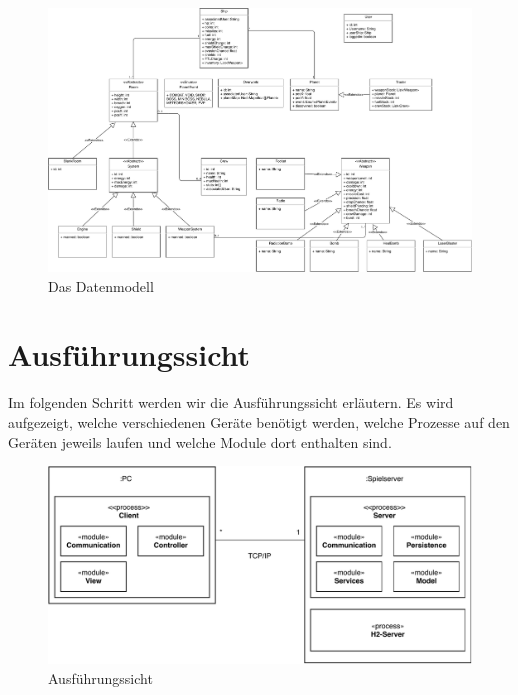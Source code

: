 \documentclass[fontsize=12pt,paper=a4,twoside]{scrartcl}
\begin{document}
\begin{figure}[H]
\begin{center}
  \includegraphics[width=\linewidth]{UML/Datenmodell.pdf}
    \caption{Das Datenmodell}
\end{center}
\end{figure}



\section{Ausführungssicht} \label{sec:ausfuehrung}


Im folgenden Schritt werden wir die Ausführungssicht erläutern. Es wird aufgezeigt, welche verschiedenen Geräte benötigt werden, welche Prozesse auf den Geräten jeweils laufen und welche Module dort enthalten sind. \\

\begin{figure}[H]
\includegraphics[width=\textwidth]{UML/Ausfuehrungssicht.pdf}
 \caption{Ausführungssicht}
\end{figure}
\end{document}
